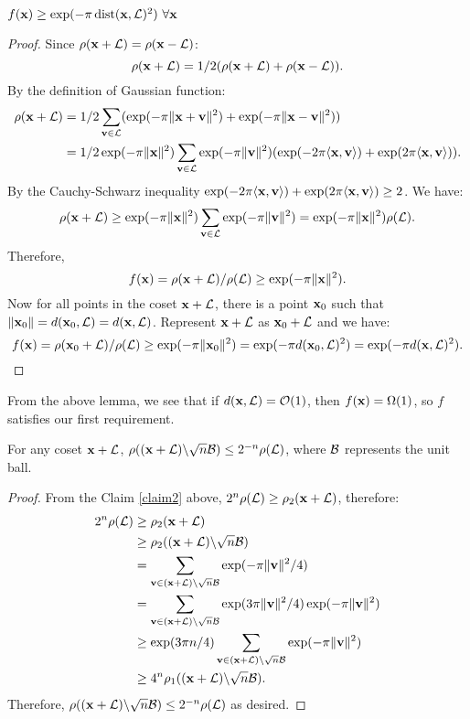 \documentclass[11pt]{article}
\begin{document}
\begin{lemma}
  $f(\mathbf{x}) \geq \exp(-\pi \operatorname{dist}(\mathbf{x},\mathcal{L})^2) \,\, \forall \mathbf{x}$
\end{lemma}

\begin{proof}
  Since $\rho(\mathbf{x}+\mathcal{L}) = \rho(\mathbf{x}-\mathcal{L})$:
  \[ \rho(\mathbf{x}+\mathcal{L}) = 1/2 (\rho(\mathbf{x}+\mathcal{L}) + \rho(\mathbf{x}-\mathcal{L})). \]
  By the definition of Gaussian function:
  \begin{align*}
    \rho(\mathbf{x}+\mathcal{L})
    &= 1/2 \sum_{\mathbf{v} \in \mathcal{L}} ( \exp(-\pi \lVert\mathbf{x}+\mathbf{v}\rVert^2)+ \exp(-\pi \lVert\mathbf{x}-\mathbf{v}\rVert^2)) \\
    &= 1/2 \exp(-\pi \lVert\mathbf{x}\rVert^2)  \sum_{\mathbf{v} \in \mathcal{L}} \exp(-\pi \lVert\mathbf{v}\rVert^2) (\exp(-2\pi \langle\mathbf{x},\mathbf{v}\rangle)+\exp(2\pi \langle\mathbf{x},\mathbf{v}\rangle)).
  \end{align*}
  By the Cauchy-Schwarz inequality
  $\exp(-2\pi \langle\mathbf{x},\mathbf{v}\rangle)+\exp(2\pi \langle\mathbf{x},\mathbf{v}\rangle) \geq
  2$. We have:
  \[ \rho(\mathbf{x}+\mathcal{L}) \geq \exp(-\pi \lVert\mathbf{x}\rVert^2) \sum_{\mathbf{v} \in
      \mathcal{L}} \exp(-\pi \lVert\mathbf{v}\rVert^2) = \exp(-\pi \lVert\mathbf{x}\rVert^2)
    \rho(\mathcal{L}).\] Therefore,
  \[ f(\mathbf{x}) = \rho(\mathbf{x}+\mathcal{L})/ \rho(\mathcal{L}) \geq \exp(-\pi
    \lVert\mathbf{x}\rVert^2).\] Now for all points in the coset
  $\mathbf{x} + \mathcal{L}$, there is a point $\mathbf{x}_0$ such that
  $ \lVert\mathbf{x}_0\rVert=d(\mathbf{x}_0,\mathcal{L}) = d(\mathbf{x},\mathcal{L})$. Represent
  $\mathbf{x} + \mathcal{L}$ as $\mathbf{x}_0 + \mathcal{L}$ and we have:
  \[ f(\mathbf{x}) = \rho(\mathbf{x}_0+\mathcal{L})/ \rho(\mathcal{L}) \geq \exp(-\pi
    \lVert\mathbf{x}_0\rVert^2) = \exp(-\pi d(\mathbf{x}_0,\mathcal{L})^2) = \exp(-\pi
    d(\mathbf{x},\mathcal{L})^2).\]
\end{proof}
From the above lemma, we see that if $d(\mathbf{x},\mathcal{L}) = \mathcal{O}(1)$,
then $f(\mathbf{x}) = \Omega(1)$, so $f$ satisfies our first requirement.

\begin{lemma}
  For any coset $\mathbf{x} + \mathcal{L}$,
  $\rho((\mathbf{x} + \mathcal{L})\backslash \sqrt{n}\mathcal{B}) \leq 2^{-n}
  \rho(\mathcal{L})$, where $\mathcal{B}$ represents the unit ball.
\end{lemma}

\begin{proof}
  From the Claim \ref{claim2} above,
  $2^n \rho(\mathcal{L}) \geq \rho_2(\mathbf{x} + \mathcal{L})$, therefore:
  \begin{align*}
    2^n \rho(\mathcal{L})
    &\geq \rho_2(\mathbf{x} + \mathcal{L}) \\
    &\geq \rho_2((\mathbf{x} + \mathcal{L})\backslash \sqrt{n}\mathcal{B}) \\
    &= \sum_{\mathbf{v} \in (\mathbf{x} + \mathcal{L}) \backslash \sqrt{n}\mathcal{B}} \exp(-\pi \lVert\mathbf{v}\rVert^2/4) \\
    &= \sum_{\mathbf{v} \in (\mathbf{x} + \mathcal{L}) \backslash \sqrt{n}\mathcal{B}} \exp(3\pi \lVert\mathbf{v}\rVert^2/4)\exp(-\pi \lVert\mathbf{v}\rVert^2) \\
    &\geq \exp(3\pi n/4) \sum_{\mathbf{v} \in (\mathbf{x} + \mathcal{L}) \backslash \sqrt{n}\mathcal{B}}\exp(-\pi \lVert\mathbf{v}\rVert^2) \\
    &\geq  4^n \rho_1((\mathbf{x} + \mathcal{L})\backslash \sqrt{n}\mathcal{B}).
  \end{align*}
  Therefore,
  $\rho((\mathbf{x} + \mathcal{L})\backslash \sqrt{n}\mathcal{B}) \leq 2^{-n}
  \rho(\mathcal{L})$ as desired.
\end{proof}
\end{document}
